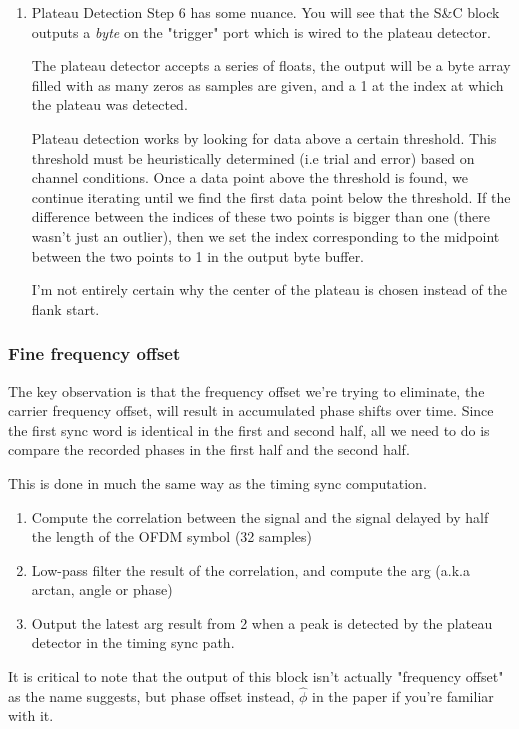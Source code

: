 \documentclass[11pt]{article}
\begin{document}
\begin{enumerate}
\item Plateau Detection
\label{sec:org3514fb5}
Step 6 has some nuance. You will see that the S\&C block outputs a
\emph{byte} on the "trigger" port which is wired to the plateau
detector.

The plateau detector accepts a series of floats, the output will be a
byte array filled with as many zeros as samples are given, and a 1 at
the index at which the plateau was detected.

Plateau detection works by looking for data above a certain
threshold. This threshold must be heuristically determined (i.e trial
and error) based on channel conditions. Once a data point above the
threshold is found, we continue iterating until we find the first data
point below the threshold. If the difference between the indices of
these two points is bigger than one (there wasn't just an outlier),
then we set the index corresponding to the midpoint between the two
points to 1 in the output byte buffer.

I'm not entirely certain why the center of the plateau is chosen
instead of the flank start.
\end{enumerate}
\subsubsection{Fine frequency offset}
\label{sec:org0cc8a98}
The key observation is that the frequency offset we're trying to
eliminate, the carrier frequency offset, will result in accumulated
phase shifts over time. Since the first sync word is identical in the
first and second half, all we need to do is compare the recorded
phases in the first half and the second half.

This is done in much the same way as the timing sync computation.
\begin{enumerate}
\item Compute the correlation between the signal and the signal delayed
by half the length of the OFDM symbol (32 samples)
\item Low-pass filter the result of the correlation, and compute the arg
(a.k.a arctan, angle or phase)
\item Output the latest arg result from 2 when a peak is detected by the
plateau detector in the timing sync path.
\end{enumerate}

It is critical to note that the output of this block isn't actually
"frequency offset" as the name suggests, but phase offset instead,
\(\hat{\phi}\) in the paper if you're familiar with it.
\end{document}
